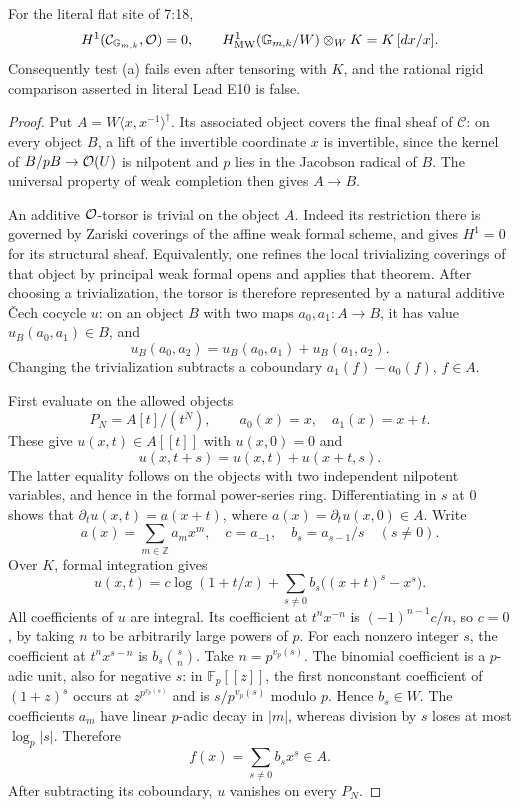 \begin{theorem}\label{thm:DE-old-Gm}
For the literal flat site of 7:18,
\[
 H^1(\mathcal C_{\mathbb G_{m,k}},\mathcal O)=0,
 \qquad
 H^1_{\rm MW}(\mathbb G_{m,k}/W)\otimes_WK
       =K\,[dx/x].
\]
Consequently test (a) fails even after tensoring with $K$, and the rational rigid comparison asserted in literal Lead E10 is false.
\end{theorem}
\begin{proof}
Put $A=W\langle x,x^{-1}\rangle^\dagger$.  Its associated object covers the final sheaf of $\mathcal C$: on every object $B$, a lift of the invertible coordinate $x$ is invertible, since the kernel of $B/pB\to\mathcal O(U)$ is nilpotent and $p$ lies in the Jacobson radical of $B$.  The universal property of weak completion then gives $A\to B$.

An additive $\mathcal O$-torsor is trivial on the object $A$.  Indeed its restriction there is governed by Zariski coverings of the affine weak formal scheme, and \cite[\S2, Theorem~14, p.~10]{Meredith1972} gives $H^1=0$ for its structural sheaf.  Equivalently, one refines the local trivializing coverings of that object by principal weak formal opens and applies that theorem.  After choosing a trivialization, the torsor is therefore represented by a natural additive \v Cech cocycle $u$: on an object $B$ with two maps $a_0,a_1:A\to B$, it has value $u_B(a_0,a_1)\in B$, and
\[
 u_B(a_0,a_2)=u_B(a_0,a_1)+u_B(a_1,a_2).
\]
Changing the trivialization subtracts a coboundary $a_1(f)-a_0(f)$, $f\in A$.

First evaluate on the allowed objects
\[
                P_N=A[t]/(t^N),\qquad
                a_0(x)=x,\quad a_1(x)=x+t.
\]
These give $u(x,t)\in A[[t]]$ with $u(x,0)=0$ and
\[
              u(x,t+s)=u(x,t)+u(x+t,s).
\]
The latter equality follows on the objects with two independent nilpotent variables, and hence in the formal power-series ring.  Differentiating in $s$ at $0$ shows that $\partial_tu(x,t)=a(x+t)$, where $a(x)=\partial_tu(x,0)\in A$.  Write
\[
 a(x)=\sum_{m\in\mathbb Z}a_mx^m,\quad
 c=a_{-1},\quad b_s=a_{s-1}/s\quad(s\ne0).
\]
Over $K$, formal integration gives
\[
 u(x,t)=c\log(1+t/x)+
       \sum_{s\ne0}b_s\bigl((x+t)^s-x^s\bigr).
\]
All coefficients of $u$ are integral.  Its coefficient at $t^nx^{-n}$ is $(-1)^{n-1}c/n$, so $c=0$, by taking $n$ to be arbitrarily large powers of $p$.  For each nonzero integer $s$, the coefficient at $t^nx^{s-n}$ is $b_s\binom{s}{n}$.  Take $n=p^{v_p(s)}$.  The binomial coefficient is a $p$-adic unit, also for negative $s$: in $\mathbb F_p[[z]]$, the first nonconstant coefficient of $(1+z)^s$ occurs at $z^{p^{v_p(s)}}$ and is $s/p^{v_p(s)}$ modulo $p$.  Hence $b_s\in W$.  The coefficients $a_m$ have linear $p$-adic decay in $|m|$, whereas division by $s$ loses at most $\log_p|s|$.  Therefore
\[
                         f(x)=\sum_{s\ne0}b_sx^s\in A.
\]
After subtracting its coboundary, $u$ vanishes on every $P_N$.


\end{proof}
